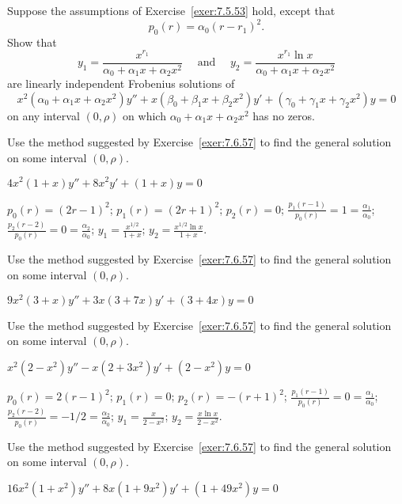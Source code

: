 \documentclass{ximera}
\begin{document}
\begin{problem}\label{exer:7.6.57}
Suppose the assumptions of Exercise~\ref{exer:7.5.53}
hold, except that
$$
p_0(r)=\alpha_0(r-r_1)^2.
$$
 Show that
$$
y_1=\frac{x^{r_1}}{\alpha_0+\alpha_1x+\alpha_2x^2}\quad\mbox{ and }\quad
y_2=\frac{x^{r_1}\ln x}{\alpha_0+\alpha_1x+\alpha_2x^2}
$$
are linearly independent Frobenius  solutions of
$$
x^2(\alpha_0+\alpha_1x+\alpha_2 x^2)y''+x(\beta_0+\beta_1x+\beta_2x^2)y'+
(\gamma_0+\gamma_1x+\gamma_2x^2)y=0
$$
on any interval $(0,\rho)$ on which
$\alpha_0+\alpha_1x+\alpha_2x^2$ has no zeros.
\end{problem}

\begin{problem}\label{exer:7.6.58}
Use the method
suggested by Exercise~\ref{exer:7.6.57} to find the general solution on
some interval $(0,\rho)$.

$4x^2(1+x)y''+8x^2y'+(1+x)y=0$

\begin{solution}
    $p_0(r)=(2r-1)^2$;
$p_1(r)=(2r+1)^2$;
$p_2(r)=0$;
$\frac{p_1(r-1)}{ p_0(r)}=1=\frac{\alpha_1}{\alpha_0}$;
$\frac{p_2(r-2)}{ p_0(r)}=0=\frac{\alpha_2}{\alpha_0}$;
$y_1=\frac{x^{1/2}}{1+x}$; $y_2=\frac{x^{1/2}\ln x}{1+x}$.
\end{solution}
\end{problem}

\begin{problem}\label{exer:7.6.59}
Use the method
suggested by Exercise~\ref{exer:7.6.57} to find the general solution on
some interval $(0,\rho)$.

$9x^2(3+x)y''+3x(3+7x)y'+(3+4x)y=0$
\end{problem}

\begin{problem}\label{exer:7.6.60}
Use the method
suggested by Exercise~\ref{exer:7.6.57} to find the general solution on
some interval $(0,\rho)$.

$x^2(2-x^2)y''-x(2+3x^2)y'+(2-x^2)y=0$

\begin{solution}
    $p_0(r)=2(r-1)^2$;
$p_1(r)=0$;
$p_2(r)=-(r+1)^2$;
$\frac{p_1(r-1)}{ p_0(r)}=0=\frac{\alpha_1}{\alpha_0}$;
$\frac{p_2(r-2)}{ p_0(r)}=-1/2=\frac{\alpha_2}{\alpha_0}$;
$y_1=\frac{x}{2-x^2}$; $y_2=\frac{x\ln x}{2-x^2}$.
\end{solution}
\end{problem}

\begin{problem}\label{exer:7.6.61}
Use the method
suggested by Exercise~\ref{exer:7.6.57} to find the general solution on
some interval $(0,\rho)$.

$16x^2(1+x^2)y''+8x(1+9x^2)y'+(1+49x^2)y=0$
\end{problem}
\end{document}
